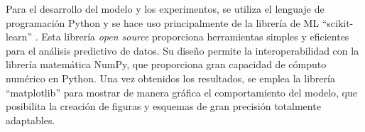 
Para el desarrollo del modelo y los experimentos, se utiliza el lenguaje de programación Python y se hace uso principalmente de la librería de \gls{ML} ``scikit-learn'' \cite{scikit-learn}. Esta librería \textit{open source} proporciona herramientas simples y eficientes para el análisis predictivo de datos. Su diseño permite la interoperabilidad con la librería matemática NumPy, que proporciona gran capacidad de cómputo numérico en Python. 
Una vez obtenidos los resultados, se emplea la librería ``matplotlib'' \cite{matplotlib} para mostrar de manera gráfica el comportamiento del modelo, que posibilita la creación de figuras y esquemas de gran precisión totalmente adaptables.  

